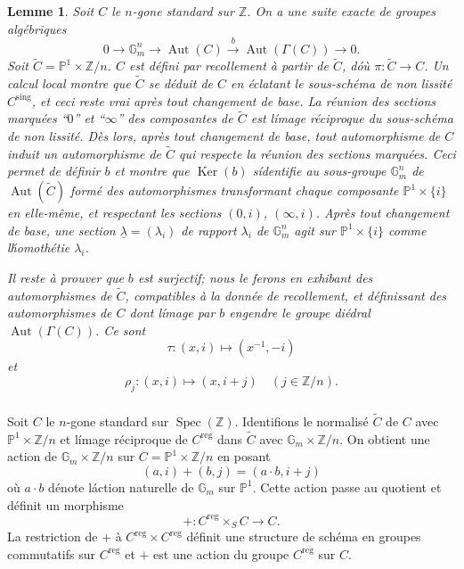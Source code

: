 \documentclass{amsart}
\theoremstyle{plain}
\newtheorem{lemma}[theorem]{Lemme}
\theoremstyle{remark}
\DeclareMathOperator{\Aut}{Aut}
\DeclareMathOperator{\Spec}{Spec}
\DeclareMathOperator{\Ker}{Ker}
\newcommand{\bbG}{\mathbb{G}}
\newcommand{\bbP}{\mathbb{P}}
\newcommand{\bbZ}{\mathbb{Z}}
\begin{document}
\begin{lemma}
Soit $C$ le $n$-gone standard sur $\bbZ$. On a une suite exacte de groupes alg\'ebriques
\[
0 \to \bbG_m^n \to \Aut(C) \xrightarrow{b} \Aut(\Gamma(C)) \to 0.
\]
Soit $\widetilde{C} = \bbP^1 \times \bbZ/n$. $C$ est d\'efini par recollement \`a partir de
$\widetilde{C}$, d\'o\`u $\pi: \widetilde{C} \to C$. Un calcul local montre que
$\widetilde{C}$ se d\'eduit de $C$ en \'eclatant le sous-sch\'ema de non lissit\'e
$C^{\mathrm{sing}}$, et ceci reste vrai apr\`es tout changement de base. La r\'eunion des sections
marqu\'ees ``$0$'' et ``$\infty$'' des composantes de $\widetilde{C}$ est l\'image
r\'eciproque du sous-sch\'ema de non lissit\'e. D\`es lors, apr\`es tout changement de
base, tout automorphisme de $C$ induit un automorphisme de $\widetilde{C}$ qui respecte
la r\'eunion des sections marqu\'ees. Ceci permet de d\'efinir $b$ et montre que
$\Ker(b)$ s\'identifie au sous-groupe $\bbG_m^n$ de $\Aut(\widetilde{C})$ form\'e des
automorphismes transformant chaque composante $\bbP^1 \times \{i\}$ en elle-m\^eme,
et respectant les sections $(0,i)$, $(\infty,i)$. Apr\`es tout changement de base, une
section $\underline{\lambda} = (\lambda_i)$ de rapport $\lambda_i$ de $\bbG_m^n$ agit sur
$\bbP^1 \times \{i\}$ comme l\'homoth\'etie $\lambda_i$.

Il reste \`a prouver que $b$ est surjectif; nous le ferons en exhibant des
automorphismes de $\widetilde{C}$, compatibles \`a la donn\'ee de recollement, et
d\'efinissant des automorphismes de $C$ dont l\'image par $b$ engendre le groupe
di\'edral $\Aut(\Gamma(C))$. Ce sont
\[
\tau: (x,i) \mapsto (x^{-1}, -i)
\]
et
\[
\rho_j: (x,i) \mapsto (x, i+j) \quad (j \in \bbZ/n).
\]
\end{lemma}

\subsubsection{}
Soit $C$ le $n$-gone standard sur $\Spec(\bbZ)$. Identifions le normalis\'e
$\widetilde{C}$ de $C$ avec $\bbP^1 \times \bbZ/n$ et l\'image r\'eciproque de
$C^{\mathrm{reg}}$ dans $\widetilde{C}$ avec $\bbG_m \times \bbZ/n$. On obtient une action de
$\bbG_m \times \bbZ/n$ sur $C = \bbP^1 \times \bbZ/n$ en posant
\[
(a,i) + (b,j) = (a \cdot b, i+j)
\]
o\`u $a \cdot b$ d\'enote l\'action naturelle de $\bbG_m$ sur $\bbP^1$. Cette action
passe au quotient et d\'efinit un morphisme
\begin{equation}
+: C^{\mathrm{reg}} \times_S C \to C.
\end{equation}
La restriction de $+$ \`a $C^{\mathrm{reg}} \times C^{\mathrm{reg}}$ d\'efinit une structure de
sch\'ema en groupes commutatifs sur $C^{\mathrm{reg}}$ et $+$ est une action du groupe
$C^{\mathrm{reg}}$ sur $C$.
\end{document}

